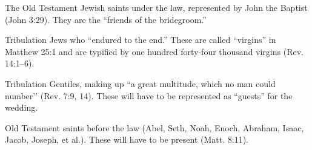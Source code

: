 {\begin{compactenum}
\item The Old Testament Jewish saints under the law, represented by John the Baptist (John 3:29). They are the “friends of the bridegroom.”
\item Tribulation Jews who “endured to the end.” These are called “virgins” in Matthew 25:1 and are typified by one hundred forty-four thousand virgins (Rev. 14:1–6).
\item Tribulation Gentiles, making up “a great multitude, which no man could number’’ (Rev. 7:9, 14). These will have to be represented as “guests” for the wedding.
\item Old Testament saints before the law (Abel, Seth, Noah, Enoch, Abraham, Isaac, Jacob, Joseph, et al.). These will have to be present (Matt. 8:11). \cite{Ruckman1992Psalms}
\end{compactenum} }
